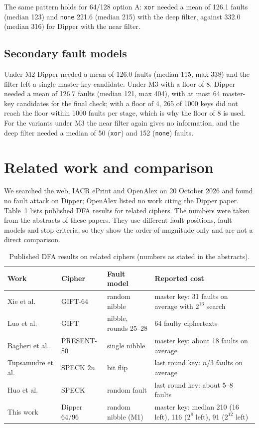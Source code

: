 \documentclass[11pt,a4paper]{article}
\begin{document}
The same pattern holds for 64/128 option A: \texttt{xor} needed a mean of 126.1 faults
(median 123) and \texttt{none} 221.6 (median 215) with the deep filter, against 332.0 (median 316)
for Dipper with the near filter.

\subsection{Secondary fault models}\label{sec:secondary}

Under M2 Dipper needed a mean of 126.0 faults (median 115, max 338) and the filter left a single
master-key candidate. Under M3 with a floor of 8, Dipper needed a mean of 126.7 faults (median
121, max 404), with at most 64 master-key candidates for the final check; with a floor of 4,
265 of 1000 keys did not reach the floor within 1000 faults per stage, which is why the floor of
8 is used. For the variants under M3 the near filter again gives no information, and the deep
filter needed a median of 50 (\texttt{xor}) and 152 (\texttt{none}) faults.

\section{Related work and comparison}\label{sec:related}

We searched the web, IACR ePrint and OpenAlex on 20 October 2026 and found no fault attack on
Dipper; OpenAlex listed no work citing the Dipper paper. Table~\ref{tab:lit} lists published DFA
results for related ciphers. The numbers were taken from the abstracts of these papers. They use
different fault positions, fault models and stop criteria, so they show the order of magnitude
only and are not a direct comparison.

\begin{table}[t]
\centering
\caption{Published DFA results on related ciphers (numbers as stated in the abstracts).}
\label{tab:lit}
\small
\begin{tabular}{p{3.2cm}p{2.0cm}p{4.0cm}p{4.6cm}}
\toprule
Work & Cipher & Fault model & Reported cost\\
\midrule
Xie et al.~\cite{Xie2021} & GIFT-64 & random nibble & master key: 31 faults on average with $2^{16}$ search\\
Luo et al.~\cite{Luo2021} & GIFT & nibble, rounds 25--28 & 64 faulty ciphertexts\\
Bagheri et al.~\cite{Bagheri2013} & PRESENT-80 & single nibble & master key: about 18 faults on average\\
Tupsamudre et al.~\cite{Tupsamudre2014} & SPECK $2n$ & bit flip & last round key: $n/3$ faults on average\\
Huo et al.~\cite{Huo2015} & SPECK & random fault & last round key: about 5--8 faults\\
\midrule
This work & Dipper 64/96 & random nibble (M1) & master key: median 210 (16 left), 116 ($2^8$ left), 91 ($2^{12}$ left)\\
\bottomrule
\end{tabular}
\end{table}
\end{document}

